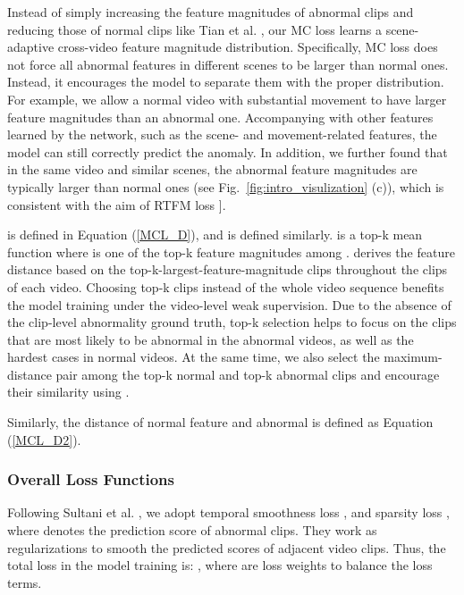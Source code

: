\documentclass[letterpaper]{article} \usepackage{aaai23}  \usepackage{times}  \usepackage{helvet}  \usepackage{courier}  \usepackage[hyphens]{url}  \usepackage{graphicx} \urlstyle{rm} \def\UrlFont{\rm}  \usepackage{natbib}  \usepackage{caption} \frenchspacing  \setlength{\pdfpagewidth}{8.5in}  \setlength{\pdfpageheight}{11in}  \usepackage{algorithm}
\newcommand{\etal}{{et al. }}
\begin{document}
Instead of simply increasing the feature magnitudes of abnormal clips and reducing those of normal clips like Tian \etal \cite{RTFM}, our MC loss learns a scene-adaptive cross-video feature magnitude distribution. Specifically, MC loss does not force all abnormal features in different scenes to be larger than normal ones. Instead, it encourages the model to separate them with the proper distribution. For example, we allow a normal video with substantial movement to have larger feature magnitudes than an abnormal one. Accompanying with other features learned by the network, such as the scene- and movement-related features, the model can still correctly predict the anomaly. In addition, we further found that in the same video and similar scenes, the abnormal feature magnitudes are typically larger than normal ones (see Fig.~\ref{fig:intro_visulization} (c)), which is consistent with the aim of RTFM loss \cite{RTFM}]. 

{\small} is defined in Equation (\ref{MCL_D}), and {\small} is defined similarly. 
{\small}
{\small} is a top-k mean function where {\small} is one of the top-k feature magnitudes among {\small}. {\small} derives the feature distance based on the top-k-largest-feature-magnitude clips throughout the {\small} clips of each video. Choosing top-k clips instead of the whole video sequence benefits the model training under the video-level weak supervision. Due to the absence of the clip-level abnormality ground truth, top-k selection helps {\small} to focus on the clips that are most likely to be abnormal in the abnormal videos, as well as the hardest cases in normal videos. At the same time, we also select the maximum-distance pair among the top-k normal and top-k abnormal clips and encourage their similarity using {\small}.


Similarly, the distance {\small} of normal feature  and abnormal  is defined as Equation (\ref{MCL_D2}).
{\small}

\subsubsection{Overall Loss Functions} Following Sultani \etal \cite{RWAD}, we adopt temporal smoothness loss {\small}, and sparsity loss {\small}, where {\small} denotes the prediction score of abnormal clips. They work as regularizations to smooth the predicted scores of adjacent video clips. Thus, the total loss in the model training is:
{\small}, where  are loss weights to balance the loss terms. 
\end{document}
